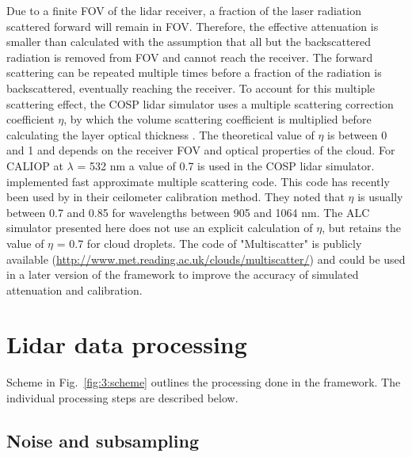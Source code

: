 Due to a finite FOV of the lidar receiver, a fraction of the laser
radiation scattered forward will remain in FOV. Therefore,
the effective attenuation is smaller than calculated with the assumption
that all but the backscattered radiation is removed from FOV and cannot
reach the receiver. The forward scattering can be repeated multiple times
before a fraction of the radiation is backscattered, eventually reaching the
receiver. To account for this multiple scattering effect, the COSP lidar
simulator uses a multiple scattering correction coefficient $\eta$, by
which the volume scattering coefficient is multiplied before calculating
the layer optical thickness \citep{chiriaco2006,chepfer2007,chepfer2008}.
The theoretical value of $\eta$ is between 0 and 1 and depends on the
receiver FOV and optical properties of the cloud. For CALIOP
at $\lambda$ = 532 nm a value of 0.7 is used in the COSP lidar simulator.
\cite{hogan2006} implemented fast approximate multiple
scattering code. This code has recently been used by \cite{hopkin2019} in their
ceilometer calibration method. They noted that $\eta$ is usually between
0.7 and 0.85 for wavelengths between 905 and 1064 nm. The ALC simulator
presented here does not use an explicit calculation of $\eta$, but retains
the value of $\eta$ = 0.7 for cloud droplets. The code of \cite{hogan2006}
"Multiscatter" is publicly available (\url{http://www.met.reading.ac.uk/clouds/multiscatter/})
and could be used in a later version of the framework to improve the
accuracy of simulated attenuation and calibration.

\section{Lidar data processing}
\label{sec:3:lidar-data-processing}

Scheme in Fig.~\ref{fig:3:scheme} outlines the processing done in the framework.
The individual processing steps are described below.

\subsection{Noise and subsampling}
\label{sec:3:noise-and-subsampling}

